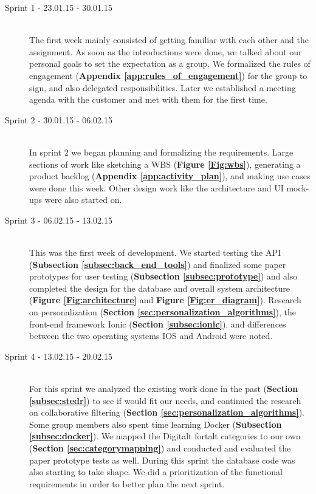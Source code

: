 \begin{description}
	
	\item[Sprint 1 - 23.01.15 - 30.01.15] \hfill \\ 
	The first week mainly consisted of getting familiar with each other and the assignment. As soon as the introductions were done, we talked about our personal goals to set the expectation as a group. We formalized the rules of engagement (\textbf{Appendix \ref{app:rules_of_engagement}}) for the group to sign, and also delegated responsibilities. Later we established a meeting agenda with the customer and met with them for the first time.
	
	\item[Sprint 2 - 30.01.15 - 06.02.15] \hfill \\ 
	In sprint 2 we began planning and formalizing the requirements. Large sections of work like sketching a WBS (\textbf{Figure \ref{Fig:wbs}}), generating a product backlog (\textbf{Appendix \ref{app:activity_plan}}), and making use cases were done this week. Other design work like the architecture and UI mock-ups were also started on.
	
	\item[Sprint 3 - 06.02.15 - 13.02.15] \hfill \\ 
	This was the first week of development. We started testing the API (\textbf{Subsection \ref{subsec:back_end_tools}}) and finalized some paper prototypes for user testing (\textbf{Subsection \ref{subsec:prototype}}) and also completed the design for the database and overall system architecture (\textbf{Figure \ref{Fig:architecture}} and \textbf{Figure \ref{Fig:er_diagram}}). Research on personalization (\textbf{Section \ref{sec:personalization_algorithms}}), the front-end framework Ionic (\textbf{Section \ref{subsec:ionic}}), and differences between the two operating systems IOS and Android were noted.
	
	\item[Sprint 4 - 13.02.15 - 20.02.15] \hfill \\ 
	For this sprint we analyzed the existing work done in the past (\textbf {Section \ref{subsec:stedr}}) to see if would fit our needs, and continued the research on collaborative filtering (\textbf {Section \ref{sec:personalization_algorithms}}). Some group members also spent time learning Docker (\textbf {Subsection \ref{subsec:docker}}). We mapped the Digitalt fortalt categories to our own (\textbf{Section \ref{sec:categorymapping}}) and conducted and evaluated the paper prototype tests as well. During this sprint the database code was also starting to take shape. We did a prioritization of the functional requirements in order to better plan the next sprint.  
	

\end{description}
